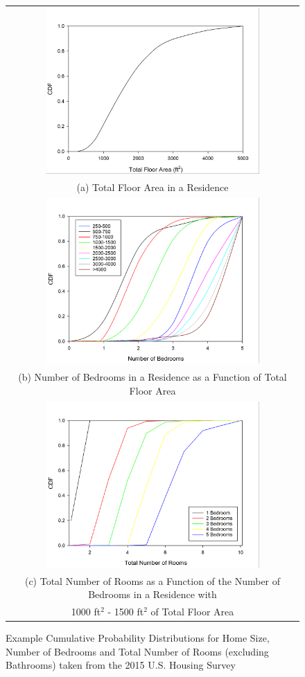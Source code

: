 \documentclass[12pt,twoside]{book}
\begin{document}
\begin{figure}[p]
\begin{tabular*}{\textwidth}{c}
\includegraphics[height=2.5in]{FIGURES/Total_Floor_Area} \\
(a) Total Floor Area in a Residence \\
\includegraphics[height=2.5in]{FIGURES/Number_of_Bedrooms} \\
(b) Number of Bedrooms in a Residence as a Function of Total Floor Area \\
\includegraphics[height=2.5in]{FIGURES/Total_Rooms} \\
(c) Total Number of Rooms as a Function of the Number of Bedrooms in a Residence with  \\
1000 ft$^2$ - 1500 ft$^2$ of Total Floor Area  \\
\end{tabular*}
\caption[Cumulative Probability Distributions for Home Size, Number of Bedrooms and Total Number of Rooms]
{Example Cumulative Probability Distributions for Home Size, Number of Bedrooms and Total Number of Rooms (excluding Bathrooms) taken from the 2015 U.S. Housing Survey \cite{AHS2015}}
\label{sample_room_distribution}
\end{figure}
\end{document}
